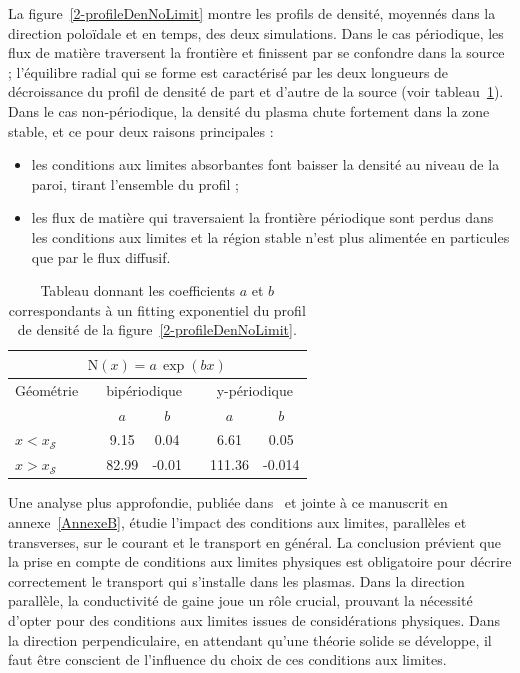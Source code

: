 \begin{refsection}
	La figure~\ref{2-profileDenNoLimit} montre les profils de densité, moyennés
	dans la direction poloïdale et en temps, des deux simulations.
	Dans le cas périodique, les flux de matière
	traversent la frontière et finissent par se confondre dans la source ;
	l'équilibre radial qui se forme est caractérisé par les deux longueurs de
	décroissance du profil de densité de part et d'autre de la source (voir tableau~\ref{2-expFit}).
	Dans le cas non-périodique, la densité du plasma chute fortement dans la zone
	stable, et ce pour deux raisons principales :
	
	\begin{itemize}
	  \item les conditions aux limites absorbantes font baisser la densité au
	  niveau de la paroi, tirant l'ensemble du profil ;
	  \item les flux de matière qui traversaient la frontière périodique sont
	  perdus dans les conditions aux limites et la région stable n'est plus
	  alimentée en particules que par le flux diffusif.
	 \end{itemize}
	
	\begin{table}[!htbp]
\footnotesize\centering
{}
\begin{tabular}{@{}lcccccc@{}}\toprule
\multicolumn{7}{c}{$\text{N}(x)=a\,\exp(bx)$}\\
\midrule 
Géométrie&&\multicolumn{2}{c}{bipériodique}&&\multicolumn{2}{c}{y-périodique}\\
\midrule 
&&$a$&$b$&&$a$&$b$\\
$x<x_\mathcal{S}$&&\footnotesize{9.15}&\footnotesize{0.04}&&\footnotesize{6.61}&\footnotesize{0.05}\\
$x>x_\mathcal{S}$&&\footnotesize{82.99}&\footnotesize{-0.01}&&\footnotesize{111.36}&\footnotesize{-0.014}\\
\bottomrule
\end{tabular}
\caption{Tableau donnant les coefficients $a$ et $b$
correspondants à un fitting exponentiel du profil de densité
de la figure~\ref{2-profileDenNoLimit}.}\label{2-expFit}
\end{table}
	
	Une analyse plus approfondie, publiée dans~\parencite{Futtersack} et
	jointe à ce manuscrit en annexe~\ref{AnnexeB}, étudie l'impact des conditions
	aux limites, parallèles et transverses, sur le courant et le transport en général.
	La conclusion prévient que la prise en compte de conditions aux limites
	physiques est obligatoire pour décrire correctement le transport qui
	s'installe dans les plasmas. Dans la direction parallèle, la conductivité de
	gaine joue un rôle crucial, prouvant la nécessité d'opter pour des conditions
	aux limites issues de considérations physiques. Dans la direction
	perpendiculaire, en attendant qu'une théorie solide se développe, il faut être
	conscient de l'influence du choix de ces conditions aux limites.
	

\end{refsection}
